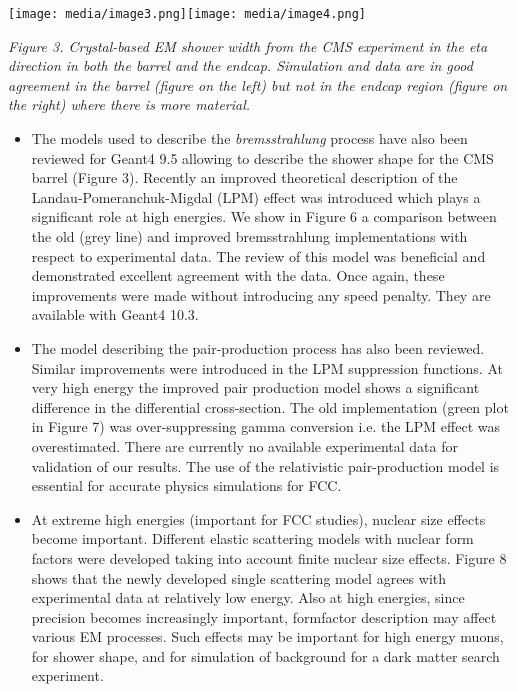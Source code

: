 \documentclass[12pt,a4paper]{article}
\begin{document}
\texttt{[image: media/image3.png]}\texttt{[image: media/image4.png]}

\emph{Figure 3. Crystal-based EM shower width from the CMS experiment in
the eta direction in both the barrel and the endcap. Simulation and data
are in good agreement in the barrel (figure on the left) but not in the
endcap region (figure on the right) where there is more material.}

\begin{itemize}
\item
  The models used to describe the \emph{bremsstrahlung} process have
  also been reviewed for Geant4 9.5 allowing to describe the shower
  shape for the CMS barrel (Figure 3). Recently an improved theoretical
  description of the Landau-Pomeranchuk-Migdal (LPM) effect was
  introduced which plays a significant role at high energies. We show in
  Figure 6 a comparison between the old (grey line) and improved
  bremsstrahlung implementations with respect to experimental data. The
  review of this model was beneficial and demonstrated excellent
  agreement with the data. Once again, these improvements were made
  without introducing any speed penalty. They are available with Geant4
  10.3.
\item
  The model describing the pair-production process has also been
  reviewed. Similar improvements were introduced in the LPM suppression
  functions. At very high energy the improved pair production model
  shows a significant difference in the differential cross-section. The
  old implementation (green plot in Figure 7) was over-suppressing gamma
  conversion i.e. the LPM effect was overestimated. There are currently
  no available experimental data for validation of our results. The use
  of the relativistic pair-production model is essential for accurate
  physics simulations for FCC.
\item
  At extreme high energies (important for FCC studies), nuclear size
  effects become important. Different elastic scattering models with
  nuclear form factors were developed taking into account finite nuclear
  size effects. Figure 8 shows that the newly developed single
  scattering model agrees with experimental data at relatively low
  energy. Also at high energies, since precision becomes increasingly
  important, formfactor description may affect various EM processes.
  Such effects may be important for high energy muons, for shower shape,
  and for simulation of background for a dark matter search experiment.
\end{itemize}
\end{document}
